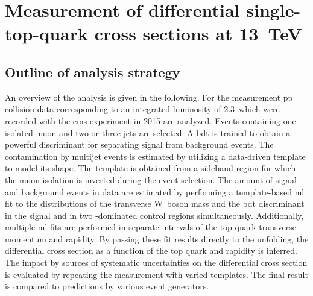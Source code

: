 \chapter{Measurement of differential single-top-quark cross sections at 13~TeV}
\label{ch:diff13}


\section{Outline of analysis strategy}

An overview of the analysis is given in the following. For the measurement \gls{pp} collision data corresponding to an integrated luminosity of 2.3~\invfb which were recorded with the \gls{cms} experiment in 2015 are analyzed. Events containing one isolated muon and two or three jets are selected. A \gls{bdt} is trained to obtain a powerful discriminant for separating signal from background events. The contamination by multijet events is estimated by utilizing a data-driven template to model its shape. The template is obtained from a sideband region for which the muon isolation is inverted during the event selection. The amount of signal and background events in data are estimated by performing a template-based \gls{ml} fit to the distributions of the transverse W~boson mass and the \gls{bdt} discriminant in the signal and in two \ttbar-dominated control regions simultaneously. Additionally, multiple \gls{ml} fits are performed in separate intervals of the top quark transverse momentum and rapidity. By passing these fit results directly to the unfolding, the differential cross section as a function of the top quark \pt and rapidity is inferred. The impact by sources of systematic uncertainties on the differential cross section is evaluated by repeating the measurement with varied templates. The final result is compared to predictions by various event generators.

